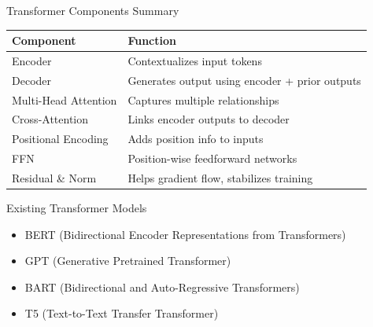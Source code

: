 \documentclass{beamer}       %
\begin{document}
\begin{frame}{Transformer Components Summary}
  \begin{tabular}{@{}ll@{}}
    \toprule
    \textbf{Component} & \textbf{Function} \\
    \midrule
    Encoder & Contextualizes input tokens \\
    Decoder & Generates output using encoder + prior outputs \\
    Multi-Head Attention & Captures multiple relationships \\
    Cross-Attention & Links encoder outputs to decoder \\
    Positional Encoding & Adds position info to inputs \\
    FFN & Position-wise feedforward networks \\
    Residual \& Norm & Helps gradient flow, stabilizes training \\
    \bottomrule
  \end{tabular}
\end{frame}

\begin{frame}{Existing Transformer Models}
    \begin{itemize}
        \item BERT (Bidirectional Encoder Representations from Transformers) 
        \item GPT (Generative Pretrained Transformer) 
        \item BART (Bidirectional and Auto-Regressive Transformers)
        \item T5 (Text-to-Text Transfer Transformer) 
    \end{itemize}
\end{frame}
\end{document}
